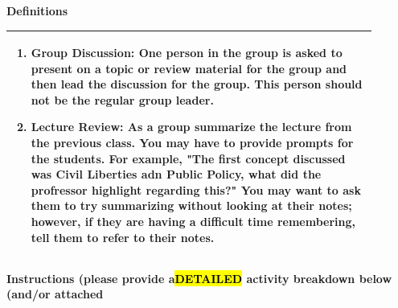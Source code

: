 \documentclass{article}
\begin{document}
\vspace{0.5cm}
{\large\textbf{Definitions}}
\\
\begin{tabular}{|p{0.9\linewidth}|}
\hline
\begin{minipage}[t]{0.9\linewidth}
\begin{enumerate}
    \item\textbf{Group Discussion:} One person in the group is asked to present on a topic or review material for the group and then lead the discussion for the group. This person should not be the regular group leader.
   \item\textbf{Lecture Review:} As a group summarize the lecture from the previous class. You may have to provide prompts for the students. For example, "The first concept discussed was Civil Liberties adn Public Policy, what did the profressor highlight regarding this?" You may want to ask them to try summarizing without looking at their notes; however, if they are having a difficult time remembering, tell them to refer to their notes.
\end{enumerate}
\end{minipage} \\
\hline
\end{tabular}
\newpage
\noindent
{\large\textbf{Instructions (please provide a\hl{DETAILED} activity breakdown below (and/or attached}}\\
\end{document}
